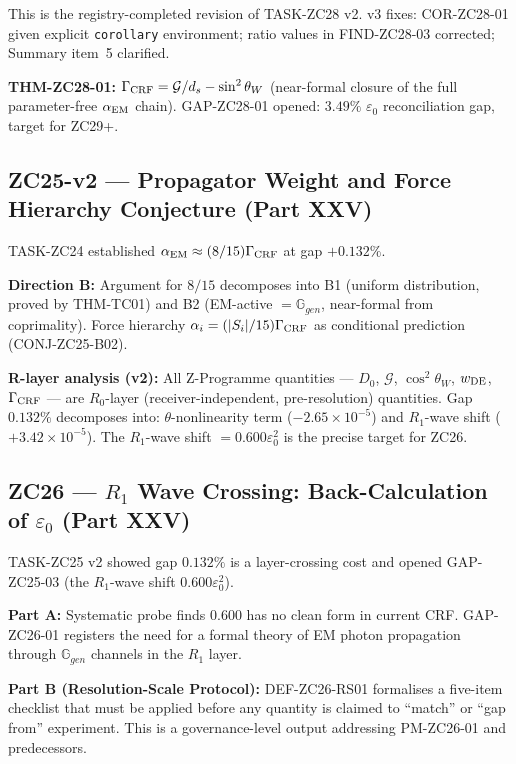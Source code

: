 \documentclass[11pt, a4paper]{article}
\begin{document}
\begin{zcbox}[title={ZC28-v3: THM-ZC28-01 --- Near-Formal Closure}]
\sloppy
This is the registry-completed revision of TASK-ZC28 v2.
v3 fixes: COR-ZC28-01 given explicit \texttt{corollary} environment;
ratio values in FIND-ZC28-03 corrected; Summary item~5 clarified.

\textbf{THM-ZC28-01:}
$\Gamma_{\rm CRF} = \mathcal{G}/d_s - \sin^2\theta_W$
(near-formal closure of the full parameter-free $\alpha_{\rm EM}$ chain).
GAP-ZC28-01 opened: $3.49\%$ $\varepsilon_0$ reconciliation gap,
target for ZC29+.
\end{zcbox}

\subsection{ZC25-v2 --- Propagator Weight and Force Hierarchy Conjecture (Part XXV)}

\begin{zcbox}[title={ZC25-v2: $R_0$-layer Identification and GAP-ZC25-03}]
\sloppy
TASK-ZC24 established $\alpha_{\rm EM} \approx (8/15)\Gamma_{\rm CRF}$
at gap $+0.132\%$.

\textbf{Direction B:} Argument for $8/15$ decomposes into B1 (uniform
distribution, proved by THM-TC01) and B2 (EM-active $= \mathbb{G}_{gen}$,
near-formal from coprimality). Force hierarchy
$\alpha_i = (|S_i|/15)\Gamma_{\rm CRF}$ as conditional prediction (CONJ-ZC25-B02).

\textbf{R-layer analysis (v2):} All Z-Programme quantities --- $D_0$,
$\mathcal{G}$, $\cos^2\theta_W$, $w_{\rm DE}$, $\Gamma_{\rm CRF}$ --- are
$R_0$-layer (receiver-independent, pre-resolution) quantities.
Gap $0.132\%$ decomposes into: $\theta$-nonlinearity term
($-2.65\times 10^{-5}$) and $R_1$-wave shift ($+3.42\times 10^{-5}$).
The $R_1$-wave shift $= 0.600\varepsilon_0^2$ is the precise target for ZC26.
\end{zcbox}

\subsection{ZC26 --- $R_1$ Wave Crossing: Back-Calculation of $\varepsilon_0$ (Part XXV)}

\begin{zcbox}[title={ZC26: DEF-ZC26-RS01 and GAP-ZC26-01}]
\sloppy
TASK-ZC25 v2 showed gap $0.132\%$ is a layer-crossing cost and opened
GAP-ZC25-03 (the $R_1$-wave shift $0.600\varepsilon_0^2$).

\textbf{Part A:} Systematic probe finds $0.600$ has no clean form in
current CRF. GAP-ZC26-01 registers the need for a formal theory of EM
photon propagation through $\mathbb{G}_{gen}$ channels in the $R_1$ layer.

\textbf{Part B (Resolution-Scale Protocol):}
DEF-ZC26-RS01 formalises a five-item checklist that must be applied
before any quantity is claimed to ``match'' or ``gap from'' experiment.
This is a governance-level output addressing PM-ZC26-01 and predecessors.
\end{zcbox}
\end{document}

